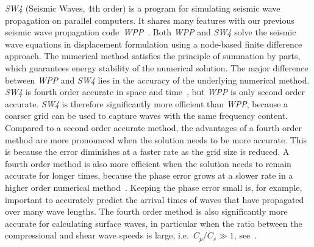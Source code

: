 \documentclass[11pt]{report}
\begin{document}
\emph{SW4} (Seismic Waves, 4th order) is a program for simulating seismic wave propagation on
parallel computers. It shares many features with our previous seismic wave propagation
code~\emph{WPP}~\cite{WPP2}. Both \emph{WPP} and \emph{SW4} solve the seismic wave equations in
displacement formulation using a node-based finite difference approach. The numerical method
satisfies the principle of summation by parts, which guarantees energy stability of the numerical
solution. The major difference between \emph{WPP} and \emph{SW4} lies in the accuracy of the
underlying numerical method. \emph{SW4} is fourth order accurate in space and time~\cite{SjoPet-12},
but \emph{WPP} is only second order accurate. \emph{SW4} is therefore significantly more efficient
than \emph{WPP}, because a coarser grid can be used to capture waves with the same frequency
content. Compared to a second order accurate method, the advantages of a fourth order method are
more pronounced when the solution needs to be more accurate. This is because the error diminishes at
a faster rate as the grid size is reduced. A fourth order method is also more efficient when the
solution needs to remain accurate for longer times, because the phase error grows at a slower rate
in a higher order numerical method~\cite{Gustafsson-Kreiss-Oliger}. Keeping the phase error small
is, for example, important to accurately predict the arrival times of waves that have propagated
over many wave lengths. The fourth order method is also significantly more accurate for calculating
surface waves, in particular when the ratio between the compressional and shear wave speeds is
large, i.e.~$C_p/C_s\gg 1$, see~\cite{KrePet-12}.

\end{document}
